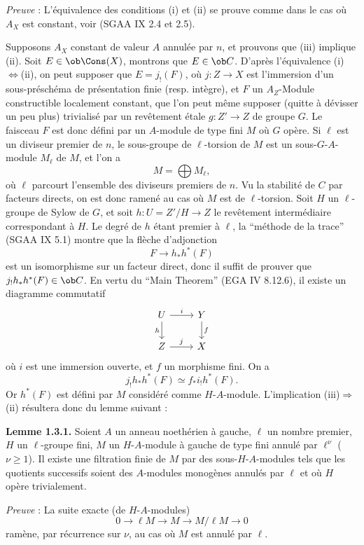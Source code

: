 \emph{Preuve} : L'équivalence des conditions (i) et (ii) se prouve comme dans le cas où $A_X$ est constant, voir (SGAA IX 2.4 et 2.5).

Supposons $A_X$ constant de valeur $A$ annulée par $n$, et prouvons que (iii) implique (ii). Soit $E\in\ob\Cons(X)$, montrons que $E\in\ob C$. D'après l'équivalence (i)$\Leftrightarrow$(ii), on peut supposer que $E=j_!(F)$, où $j:Z\to X$ est l'immersion d'un sous-préschéma de présentation finie (resp. intègre), et $F$ un $A_Z$-Module constructible localement constant, que l'on peut même supposer (quitte à dévisser un peu plus) trivialisé par un revêtement étale $g:Z'\to Z$ de groupe $G$. Le faisceau $F$ est donc défini par un $A$-module de type fini $M$ où $G$ opère. Si $\ell$ est un diviseur premier de $n$, le sous-groupe de $\ell$-torsion de $M$ est un sous-$G$-$A$-module $M_\ell$ de $M$, et l'on a
\[
        M=\bigoplus M_\ell,
\]
où $\ell$ parcourt l'ensemble des diviseurs premiers de $n$. Vu la stabilité de $C$ par facteurs directs, on est donc ramené au cas où $M$ est de $\ell$-torsion. Soit $H$ un $\ell$-groupe de Sylow de $G$, et soit $h:U=Z'/H\to Z$ le revêtement intermédiaire correspondant à $H$. Le degré de $h$ étant premier à $\ell$, la ``méthode de la trace'' (SGAA IX 5.1) montre que la flèche d'adjonction
\[
        F\longrightarrow h_*h^*(F)
\]
est un isomorphisme sur un facteur direct, donc il suffit de prouver que $j_!h_*h^*(F)\in\ob C$. En vertu du ``Main Theorem'' (EGA IV 8.12.6), il existe un diagramme commutatif
\[
\begin{tikzcd}
U \arrow[r,"i"] \arrow[d,"h"'] & Y \arrow[d,"f"]\\
Z \arrow[r,"j"] & X
\end{tikzcd}
\]
où $i$ est une
immersion ouverte, et $f$ un morphisme fini. On a
\[
        j_!h_*h^*(F) \simeq f_* i_! h^*(F).
\]
Or $h^*(F)$ est défini par $M$ considéré comme $H$-$A$-module. L'implication (iii)$\Rightarrow$(ii) résultera donc du lemme suivant :

\textbf{Lemme 1.3.1.} Soient $A$ un anneau noethérien à gauche, $\ell$ un nombre premier, $H$ un $\ell$-groupe fini, $M$ un $H$-$A$-module à gauche de type fini annulé par $\ell^\nu$ ($\nu\geq 1$). Il existe une filtration finie de $M$ par des sous-$H$-$A$-modules tels que les quotients successifs soient des $A$-modules monogènes annulés par $\ell$ et où $H$ opère trivialement.

\emph{Preuve} : La suite exacte (de $H$-$A$-modules)
\[
        0\longrightarrow \ell M\longrightarrow M\longrightarrow M/\ell M\longrightarrow 0
\]
ramène, par récurrence sur $\nu$, au cas où $M$ est annulé par $\ell$.

